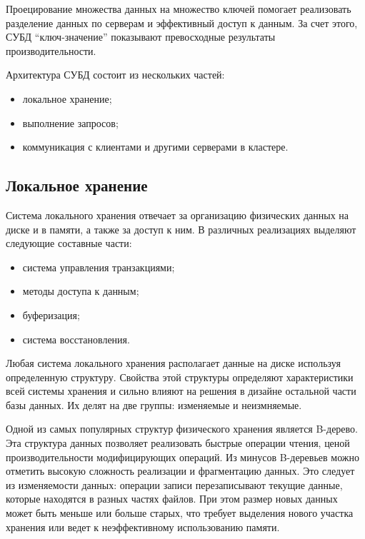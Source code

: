 \documentclass[14pt, russian]{scrartcl}
\begin{document}
Проецирование множества данных на множество ключей помогает реализовать
разделение данных по серверам и эффективный доступ к данным. За счет этого, СУБД
``ключ-значение'' показывают превосходные результаты производительности.

Архитектура СУБД состоит из нескольких частей\cite{petrov2019database}:

\begin{itemize}
  \item локальное хранение;
  \item выполнение запросов;
  \item коммуникация с клиентами и другими серверами в кластере.
\end{itemize}

\subsection{Локальное хранение}

Система локального хранения отвечает за организацию физических данных на диске и
в памяти, а также за доступ к ним. В различных реализациях выделяют следующие
составные части\cite{petrov2019database}:

\begin{itemize}
  \item система управления транзакциями;
  \item методы доступа к данным;
  \item буферизация;
  \item система восстановления.
\end{itemize}

Любая система локального хранения располагает данные на диске используя
определенную структуру. Свойства этой структуры определяют характеристики всей
системы хранения и сильно влияют на решения в дизайне остальной части базы
данных. Их делят на две группы: изменяемые и
неизмняемые\cite{petrov2019database}.

Одной из самых популярных структур физического хранения является B-дерево. Эта
структура данных позволяет реализовать быстрые операции чтения, ценой
производительности модифицирующих операций. Из минусов B-деревьев можно отметить
высокую сложность реализации и фрагментацию данных. Это следует из изменяемости
данных: операции записи перезаписывают текущие данные, которые находятся в
разных частях файлов. При этом размер новых данных может быть меньше или больше
старых, что требует выделения нового участка хранения или ведет к неэффективному
использованию памяти.
\end{document}
